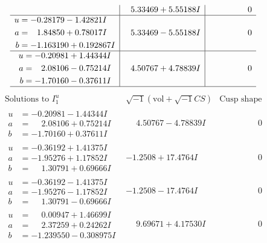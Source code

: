 \documentclass[1p]{elsarticle_modified}
\theoremstyle{definition}
\newcommand{\I}{\sqrt{-1}}
\begin{document}
$$\begin{array}{c|c|c}
 & \phantom{-}5.33469 + 5.55188 I & \phantom{-0.000000 } 0 \\ \hline\begin{aligned}
u &= -0.28179 - 1.42821 I \\
a &= \phantom{-}1.84850 + 0.78017 I \\
b &= -1.163190 + 0.192867 I\end{aligned}
 & \phantom{-}5.33469 - 5.55188 I & \phantom{-0.000000 } 0 \\ \hline\begin{aligned}
u &= -0.20981 + 1.44344 I \\
a &= \phantom{-}2.08106 - 0.75214 I \\
b &= -1.70160 - 0.37611 I\end{aligned}
 & \phantom{-}4.50767 + 4.78839 I & \phantom{-0.000000 } 0\\
 \hline 
 \end{array}$$\newpage$$\begin{array}{c|c|c}  
\text{Solutions to }I^u_{1}& \I (\text{vol} + \sqrt{-1}CS) & \text{Cusp shape}\\
 \hline 
\begin{aligned}
u &= -0.20981 - 1.44344 I \\
a &= \phantom{-}2.08106 + 0.75214 I \\
b &= -1.70160 + 0.37611 I\end{aligned}
 & \phantom{-}4.50767 - 4.78839 I & \phantom{-0.000000 } 0 \\ \hline\begin{aligned}
u &= -0.36192 + 1.41375 I \\
a &= -1.95276 + 1.17852 I \\
b &= \phantom{-}1.30791 + 0.69666 I\end{aligned}
 & -1.2508 + 17.4764 I & \phantom{-0.000000 } 0 \\ \hline\begin{aligned}
u &= -0.36192 - 1.41375 I \\
a &= -1.95276 - 1.17852 I \\
b &= \phantom{-}1.30791 - 0.69666 I\end{aligned}
 & -1.2508 - 17.4764 I & \phantom{-0.000000 } 0 \\ \hline\begin{aligned}
u &= \phantom{-}0.00947 + 1.46699 I \\
a &= \phantom{-}2.37259 + 0.24262 I \\
b &= -1.239550 - 0.308975 I\end{aligned}
 & \phantom{-}9.69671 + 4.17530 I & \phantom{-0.000000 } 0 \\ \hline\begin{aligned}

\end{aligned}
\end{array}$$
\end{document}
